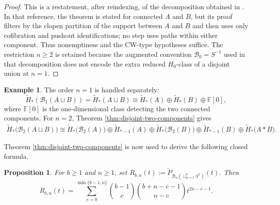 \documentclass[11pt,a4paper]{article}
\numberwithin{equation}{section}
\newtheorem{prop}[thm]{Proposition}
\theoremstyle{definition}
\newtheorem{exa}[thm]{Example}
\theoremstyle{remark}
\newcommand{\F}{\mathbb{F}}
\newcommand{\wt}{\widetilde}
\newcommand{\BB}{\mathcal B}
\begin{document}
\begin{proof} This is a restatement, after reindexing, of the decomposition obtained in \cite[Theorem~5.19]{AKN2016}. In that reference, the theorem is stated for connected $A$ and $B$, but its proof filters by the clopen partition of the support between \(A\) and \(B\) and then uses only cofibration and pushout identifications; no step uses paths within either component. Thus nonemptiness and the CW-type hypotheses suffice. The restriction \(n\ge2\) is retained because the augmented convention \(\BB_0=S^{-1}\) used in that decomposition does not encode the extra reduced \(H_0\)-class of a disjoint union at \(n=1\).
\end{proof}
 
\begin{exa}\rm The order \(n=1\) is handled separately:
\[
\widetilde H_*(\BB_1(A\sqcup B))
=\widetilde H_*(A\sqcup B)
\cong\widetilde H_*(A)\oplus\widetilde H_*(B)\oplus\F[0],
\]
where \(\F[0]\) is the one-dimensional class detecting the two connected
components. For \(n=2\), Theorem \ref{thm:disjoint-two-components} gives
    \[
\begin{aligned}
\widetilde H_*\bigl(\BB_2(A\sqcup B)\bigr)
\cong {}
\widetilde H_*\bigl(\BB_2(A)\bigr)
\oplus
\widetilde H_{*-1}(A)
\oplus
\widetilde H_*\bigl(\BB_2(B)\bigr)
\oplus
\widetilde H_{*-1}(B)
\oplus
\widetilde H_*\bigl(A*B\bigr).
\end{aligned}
\]
\end{exa}

Theorem \ref{thm:disjoint-two-components} is now used to derive the following closed formula.

\begin{prop}\label{prop:Rbn-formula}
For \(b\ge1\) and \(n\ge1\), set
$\displaystyle
R_{b,n}(t):=
\wt P_{\BB_n(\sqcup_{a=1}^{b}S^1)}(t).
$
Then
\begin{equation}\label{eq:Rbn-explicit}
R_{b,n}(t)=
\sum_{c=0}^{\min\{b-1,n\}}
\binom{b-1}{c}\binom{b+n-c-1}{n-c}t^{2n-c-1}.
\end{equation}
\end{prop}
\end{document}
